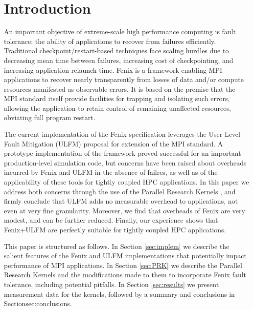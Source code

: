 \section{Introduction}
An important objective of extreme-scale high performance computing is fault tolerance:
the ability of applications to recover from failures efficiently.
Traditional checkpoint/restart-based techniques face scaling hurdles due to decreasing
mean time between failures, increasing cost of checkpointing, and 
increasing application relaunch time.
Fenix is a framework enabling MPI applications to recover nearly transparently from 
losses of data and/or compute resources manifested as observable errors.
It is based on the premise that the MPI standard itself provide facilities for trapping
and isolating such errors, allowing the application to retain control of remaining unaffected
resources, obviating  full program restart.

The current implementation of the Fenix specification \cite{fenixspec} leverages
the  User Level Fault Mitigation (ULFM) \cite{bland2013post} proposal for extension
of the MPI standard.
A prototype implementation of the framework \cite{Gamell:2014} proved successful for
an important production-level simulation code, but concerns have been raised about
overheads incurred by Fenix and ULFM in the absence of failres, as well as of the
applicability of these tools for tightly coupled HPC applications.
In this paper we address both concerns through the use of the Parallel Research Kernels
\cite{van2016comparing}, and firmly conclude that ULFM adds no measurable
overhead to applications, not even at very fine granularity.
Moreover, we find that overheads of Fenix are very modest, and can be further reduced.
Finally, our experience shows that Fenix+ULFM are perfectly suitable for tightly coupled
HPC applications.

This paper is structured as follows.
In Section \ref{sec:implem} we describe the salient features of the Fenix and ULFM
implementations that potentially impact performance of MPI applications.
In Section \ref{sec:PRK} we describe the Parallel Research Kernels and the modifications
made to them to incorporate Fenix fault tolerance, including potential pitfalls.
In Section \ref{sec:results} we present measurement data for the kernels,
followed by a summary and conclusions in Section{sec:conclusions}.
